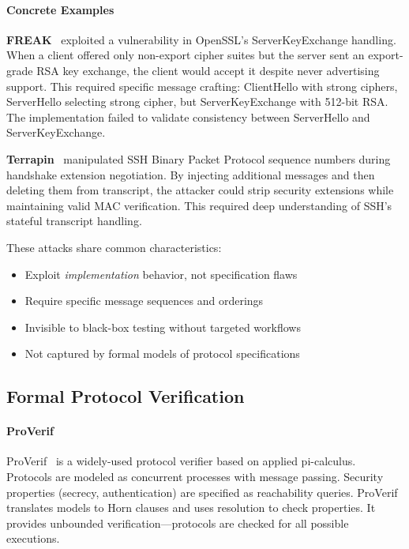 \documentclass[10pt,twocolumn]{article}
\begin{document}
\paragraph{Concrete Examples}
\textbf{FREAK}~\cite{beurdouche2015messy} exploited a vulnerability in OpenSSL's ServerKeyExchange handling. When a client offered only non-export cipher suites but the server sent an export-grade RSA key exchange, the client would accept it despite never advertising support. This required specific message crafting: ClientHello with strong ciphers, ServerHello selecting strong cipher, but ServerKeyExchange with 512-bit RSA. The implementation failed to validate consistency between ServerHello and ServerKeyExchange.

\textbf{Terrapin}~\cite{baumer2024terrapin} manipulated SSH Binary Packet Protocol sequence numbers during handshake extension negotiation. By injecting additional messages and then deleting them from transcript, the attacker could strip security extensions while maintaining valid MAC verification. This required deep understanding of SSH's stateful transcript handling.

These attacks share common characteristics:
\begin{itemize}[leftmargin=*,noitemsep]
\item Exploit \emph{implementation} behavior, not specification flaws
\item Require specific message sequences and orderings
\item Invisible to black-box testing without targeted workflows
\item Not captured by formal models of protocol specifications
\end{itemize}

\subsection{Formal Protocol Verification}

\paragraph{ProVerif}
ProVerif~\cite{blanchet2016modeling} is a widely-used protocol verifier based on applied pi-calculus. Protocols are modeled as concurrent processes with message passing. Security properties (secrecy, authentication) are specified as reachability queries. ProVerif translates models to Horn clauses and uses resolution to check properties. It provides unbounded verification—protocols are checked for all possible executions.
\end{document}
